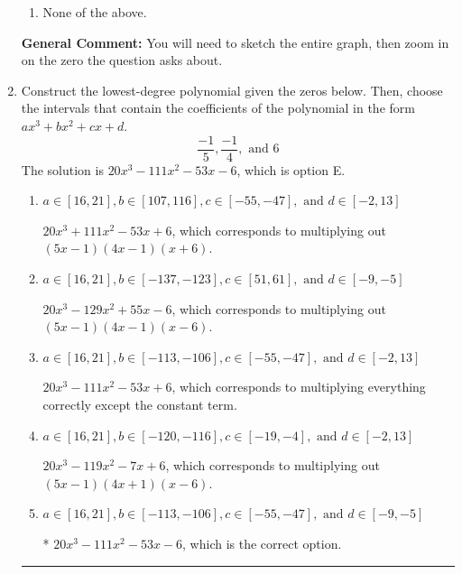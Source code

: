 \documentclass{extbook}[14pt]
\newcommand{\litem}[1]{\item #1

\rule{\textwidth}{0.4pt}}
\begin{document}
\begin{enumerate}
{\begin{enumerate}[label=\Alph*.]
\item None of the above.\end{enumerate}
\textbf{General Comment:} You will need to sketch the entire graph, then zoom in on the zero the question asks about.
}
\litem{
Construct the lowest-degree polynomial given the zeros below. Then, choose the intervals that contain the coefficients of the polynomial in the form $ax^3+bx^2+cx+d$.
\[ \frac{-1}{5}, \frac{-1}{4}, \text{ and } 6 \]The solution is \( 20x^{3} -111 x^{2} -53 x -6 \), which is option E.\begin{enumerate}[label=\Alph*.]
\item \( a \in [16, 21], b \in [107, 116], c \in [-55, -47], \text{ and } d \in [-2, 13] \)

$20x^{3} +111 x^{2} -53 x + 6$, which corresponds to multiplying out $(5x -1)(4x -1)(x + 6)$.
\item \( a \in [16, 21], b \in [-137, -123], c \in [51, 61], \text{ and } d \in [-9, -5] \)

$20x^{3} -129 x^{2} +55 x -6$, which corresponds to multiplying out $(5x -1)(4x -1)(x -6)$.
\item \( a \in [16, 21], b \in [-113, -106], c \in [-55, -47], \text{ and } d \in [-2, 13] \)

$20x^{3} -111 x^{2} -53 x + 6$, which corresponds to multiplying everything correctly except the constant term.
\item \( a \in [16, 21], b \in [-120, -116], c \in [-19, -4], \text{ and } d \in [-2, 13] \)

$20x^{3} -119 x^{2} -7 x + 6$, which corresponds to multiplying out $(5x -1)(4x + 1)(x -6)$.
\item \( a \in [16, 21], b \in [-113, -106], c \in [-55, -47], \text{ and } d \in [-9, -5] \)

* $20x^{3} -111 x^{2} -53 x -6$, which is the correct option.
\end{enumerate}

}
\end{enumerate}
\end{document}
